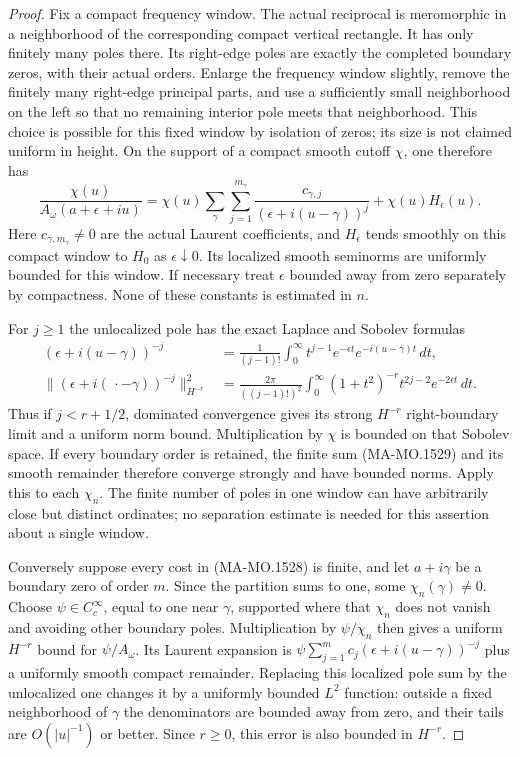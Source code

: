 \begin{proof}
Fix a compact frequency window.  The actual reciprocal is
meromorphic in a neighborhood of the corresponding compact
vertical rectangle.  It has only finitely many poles there.
Its right-edge poles are exactly the completed boundary zeros,
with their actual orders.  Enlarge the frequency window slightly,
remove the finitely many right-edge principal parts, and use a
sufficiently small neighborhood on the left so that no remaining
interior pole meets that neighborhood.  This choice is possible
for this fixed window by isolation of zeros; its size is not
claimed uniform in height.  On the support of a compact smooth
cutoff $\chi$, one therefore has
\[
 \frac{\chi(u)}{A_\omega(a+\epsilon+iu)}
   =\chi(u)\sum_{\gamma}\sum_{j=1}^{m_\gamma}
          \frac{c_{\gamma,j}}{(\epsilon+i(u-\gamma))^j}
                    +\chi(u)H_\epsilon(u).
 \tag{MA-MO.1529}
\]
Here $c_{\gamma,m_\gamma}\ne0$ are the actual Laurent
coefficients, and $H_\epsilon$ tends smoothly on this compact
window to $H_0$ as $\epsilon\downarrow0$.  Its localized
smooth seminorms are uniformly bounded for this window.
If necessary treat $\epsilon$ bounded away from zero separately
by compactness.  None of these constants is estimated in $n$.

For $j\ge1$ the unlocalized pole has the exact Laplace and
Sobolev formulas
\[
\begin{aligned}
 (\epsilon+i(u-\gamma))^{-j}
   &=\frac1{(j-1)!}\int_0^\infty
         t^{j-1}e^{-\epsilon t}e^{-i(u-\gamma)t}\,dt,\\
 \|(\epsilon+i(\,\cdot-\gamma))^{-j}\|_{H^{-r}}^2
   &=\frac{2\pi}{((j-1)!)^2}
       \int_0^\infty(1+t^2)^{-r}
                        t^{2j-2}e^{-2\epsilon t}\,dt .
\end{aligned}
\tag{MA-MO.1530}
\]
Thus if $j<r+1/2$, dominated convergence gives its strong
$H^{-r}$ right-boundary limit and a uniform norm bound.
Multiplication by $\chi$ is bounded on that Sobolev space.
If every boundary order is retained, the finite sum
(MA-MO.1529) and its smooth remainder therefore converge
strongly and have bounded norms.  Apply this to each $\chi_n$.
The finite number of poles in one window can have arbitrarily
close but distinct ordinates; no separation estimate is needed
for this assertion about a single window.

Conversely suppose every cost in (MA-MO.1528) is finite, and
let $a+i\gamma$ be a boundary zero of order $m$.
Since the partition sums to one, some $\chi_n(\gamma)\ne0$.
Choose $\psi\in C_c^\infty$, equal to one near $\gamma$,
supported where that $\chi_n$ does not vanish and avoiding
other boundary poles.  Multiplication by $\psi/\chi_n$
then gives a uniform $H^{-r}$ bound for $\psi/A_\omega$.
Its Laurent expansion is
$\psi\sum_{j=1}^m c_j(\epsilon+i(u-\gamma))^{-j}$
plus a uniformly smooth compact remainder.
Replacing this localized pole sum by the unlocalized one
changes it by a uniformly bounded $L^2$ function:
outside a fixed neighborhood of $\gamma$ the denominators
are bounded away from zero, and their tails are $O(|u|^{-1})$
or better.  Since $r\ge0$, this error is also bounded in
$H^{-r}$.


\end{proof}
